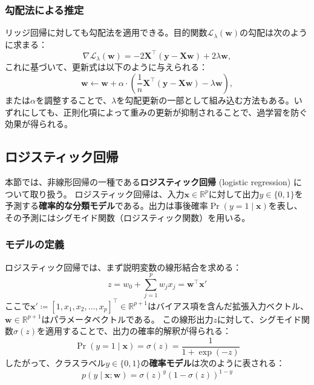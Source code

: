 \subsubsection{勾配法による推定}
リッジ回帰に対しても勾配法を適用できる。目的関数$\mathcal{L}_\lambda(\mathbf{w})$の勾配は次のように求まる：
\begin{equation}
\nabla \mathcal{L}_\lambda(\mathbf{w}) = -2\mathbf{X}^\top(\mathbf{y} - \mathbf{Xw}) + 2\lambda \mathbf{w},
\end{equation}
これに基づいて、更新式は以下のように与えられる：
\begin{equation}
\mathbf{w} \leftarrow \mathbf{w} + \alpha \cdot \left( \frac{1}{n} \mathbf{X}^\top (\mathbf{y} - \mathbf{Xw}) - \lambda \mathbf{w} \right),
\end{equation}
または$\alpha$を調整することで、$\lambda$を勾配更新の一部として組み込む方法もある。いずれにしても、正則化項によって重みの更新が抑制されることで、過学習を防ぐ効果が得られる。
\subsection{ロジスティック回帰}
本節では、非線形回帰の一種である\textbf{ロジスティック回帰} (logistic regression) について取り扱う。
ロジスティック回帰は、入力$\mathbf{x} \in \mathbb{R}^p$に対して出力$y \in \{0, 1\}$を予測する\textbf{確率的な分類モデル}である。出力は事後確率$\Pr(y=1 \mid \mathbf{x})$を表し、その予測にはシグモイド関数（ロジスティック関数）を用いる。
\subsubsection{モデルの定義}
ロジスティック回帰では、まず説明変数の線形結合を求める：
\begin{equation}
z = w_0 + \sum_{j=1}^p w_j x_j = \mathbf{w}^\top \mathbf{x}'
\end{equation}
ここで$\mathbf{x}' \coloneqq [1, x_1, x_2, \dots, x_p]^\top \in \mathbb{R}^{p+1}$はバイアス項を含んだ拡張入力ベクトル、$\mathbf{w} \in \mathbb{R}^{p+1}$はパラメータベクトルである。
この線形出力$z$に対して、シグモイド関数$\sigma(z)$を適用することで、出力の確率的解釈が得られる：
\begin{equation}
\Pr(y = 1 \mid \mathbf{x}) = \sigma(z) = \frac{1}{1 + \exp(-z)}
\end{equation}
したがって、クラスラベル$y \in \{0, 1\}$の\textbf{確率モデル}は次のように表される：
\begin{equation}
p(y \mid \mathbf{x}; \mathbf{w}) = \sigma(z)^y (1 - \sigma(z))^{1 - y}
\end{equation}
